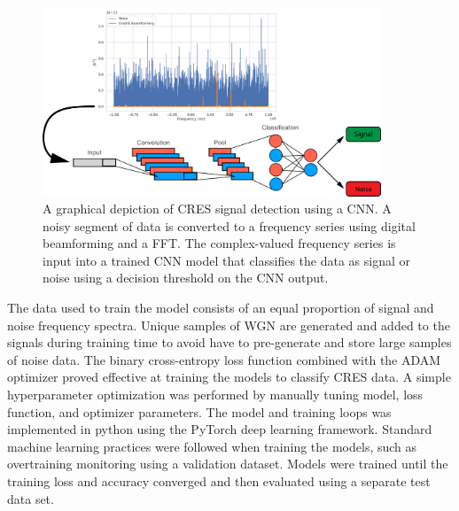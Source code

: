 \begin{figure}[htbp]
    \centering
    \includegraphics*[width=0.9\textwidth]{figs/Chapter-4/230727_deep_filter_process.png}
    \caption{\label{fig:chap4-deepfilter-process} A graphical depiction of CRES signal detection using a CNN. A noisy segment of data is converted to a frequency series using digital beamforming and a FFT. The complex-valued frequency series is input into a trained CNN model that classifies the data as signal or noise using a decision threshold on the CNN output. }
\end{figure}

The data used to train the model consists of an equal proportion of signal and noise frequency spectra. Unique samples of WGN are generated and added to the signals during training time to avoid have to pre-generate and store large samples of noise data. The binary cross-entropy loss function combined with the ADAM optimizer proved effective at training the models to classify CRES data. A simple hyperparameter optimization was performed by manually tuning model, loss function, and optimizer parameters. The model and training loops was implemented in python using the PyTorch deep learning framework. Standard machine learning practices were followed when training the models, such as overtraining monitoring using a validation dataset. Models were trained until the training loss and accuracy converged and then evaluated using a separate test data set.

